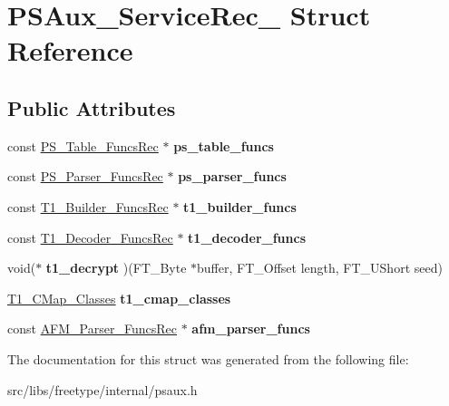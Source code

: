 \hypertarget{struct_p_s_aux___service_rec__}{
\section{PSAux\_\-ServiceRec\_\- Struct Reference}
\label{struct_p_s_aux___service_rec__}
}
\subsection*{Public Attributes}
\begin{DoxyCompactItemize}
\item 
\hypertarget{struct_p_s_aux___service_rec___ad328bf7394cad5b2838822aa109acc42}{
const \hyperlink{struct_p_s___table___funcs_rec__}{PS\_\-Table\_\-FuncsRec} $\ast$ {\bfseries ps\_\-table\_\-funcs}}
\label{struct_p_s_aux___service_rec___ad328bf7394cad5b2838822aa109acc42}

\item 
\hypertarget{struct_p_s_aux___service_rec___ac673695e814332b38fd33c7f0287a4b7}{
const \hyperlink{struct_p_s___parser___funcs_rec__}{PS\_\-Parser\_\-FuncsRec} $\ast$ {\bfseries ps\_\-parser\_\-funcs}}
\label{struct_p_s_aux___service_rec___ac673695e814332b38fd33c7f0287a4b7}

\item 
\hypertarget{struct_p_s_aux___service_rec___a3fe7449b123d0fb6f7ba92462c4e94c1}{
const \hyperlink{struct_t1___builder___funcs_rec__}{T1\_\-Builder\_\-FuncsRec} $\ast$ {\bfseries t1\_\-builder\_\-funcs}}
\label{struct_p_s_aux___service_rec___a3fe7449b123d0fb6f7ba92462c4e94c1}

\item 
\hypertarget{struct_p_s_aux___service_rec___a5cfe03f55fa4c342a094fd31355835b2}{
const \hyperlink{struct_t1___decoder___funcs_rec__}{T1\_\-Decoder\_\-FuncsRec} $\ast$ {\bfseries t1\_\-decoder\_\-funcs}}
\label{struct_p_s_aux___service_rec___a5cfe03f55fa4c342a094fd31355835b2}

\item 
\hypertarget{struct_p_s_aux___service_rec___a908d3ea91a5c313015bc90568026d57c}{
void($\ast$ {\bfseries t1\_\-decrypt} )(FT\_\-Byte $\ast$buffer, FT\_\-Offset length, FT\_\-UShort seed)}
\label{struct_p_s_aux___service_rec___a908d3ea91a5c313015bc90568026d57c}

\item 
\hypertarget{struct_p_s_aux___service_rec___a4ac30b929dcc6127200baea07b5b406a}{
\hyperlink{struct_t1___c_map___classes_rec__}{T1\_\-CMap\_\-Classes} {\bfseries t1\_\-cmap\_\-classes}}
\label{struct_p_s_aux___service_rec___a4ac30b929dcc6127200baea07b5b406a}

\item 
\hypertarget{struct_p_s_aux___service_rec___a9ddf18cc18487266a3e1dd7721fd12fb}{
const \hyperlink{struct_a_f_m___parser___funcs_rec__}{AFM\_\-Parser\_\-FuncsRec} $\ast$ {\bfseries afm\_\-parser\_\-funcs}}
\label{struct_p_s_aux___service_rec___a9ddf18cc18487266a3e1dd7721fd12fb}

\end{DoxyCompactItemize}


The documentation for this struct was generated from the following file:\begin{DoxyCompactItemize}
\item 
src/libs/freetype/internal/psaux.h\end{DoxyCompactItemize}
